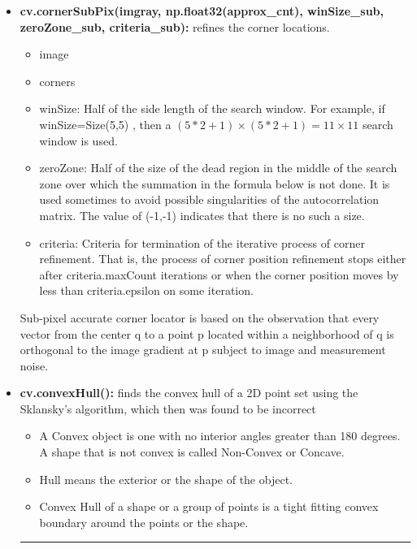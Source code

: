 \documentclass{article}
\begin{document}
\begin{itemize}
    \item \textbf{cv.cornerSubPix(imgray, np.float32(approx\_cnt), winSize\_sub, zeroZone\_sub, criteria\_sub):} refines the corner locations.
    \begin{itemize}
        \item image
        \item corners
        \item winSize: 	Half of the side length of the search window. For example, if winSize=Size(5,5) , then a \((5*2+1) \times (5*2+1)=11 \times 11\) search window is used. 
        \item zeroZone: Half of the size of the dead region in the middle of the search zone over which the summation in the formula below is not done. It is used sometimes to avoid possible singularities of the autocorrelation matrix. The value of (-1,-1) indicates that there is no such a size. 
        \item criteria: Criteria for termination of the iterative process of corner refinement. That is, the process of corner position refinement stops either after criteria.maxCount iterations or when the corner position moves by less than criteria.epsilon on some iteration. 
    \end{itemize}
    Sub-pixel accurate corner locator is based on the observation that every vector from the center q to a point p located within a neighborhood of q is orthogonal to the image gradient at p subject to image and measurement noise. 

    \item \textbf{cv.convexHull():} finds the convex hull of a 2D point set using the Sklansky's algorithm, which then was found to be incorrect
    \begin{itemize}
        \item A Convex object is one with no interior angles greater than 180 degrees. A shape that is not convex is called Non-Convex or Concave.
        \item Hull means the exterior or the shape of the object.
        \item Convex Hull of a shape or a group of points is a tight fitting convex boundary around the points or the shape.
    \end{itemize}


    \par\noindent\rule{\textwidth}{0.5pt}
    \par






\end{itemize}
\end{document}
